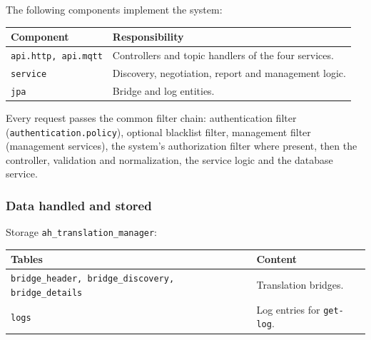 \documentclass[a4paper]{arrowhead}
\begin{document}
The following components implement the system:

\noindent\begin{longtable}{| p{5.6cm} | p{9.6cm} |} \hline
\rowcolor{gray!33} Component & Responsibility \\ \hline \endhead
\texttt{api.\allowbreak{}http,\allowbreak{} api.\allowbreak{}mqtt} & Controllers and topic handlers of the four services. \\ \hline
\texttt{service} & Discovery, negotiation, report and management logic. \\ \hline
\texttt{jpa} & Bridge and log entities. \\ \hline
\end{longtable}

Every request passes the common filter chain: authentication filter (\texttt{authentication.\allowbreak{}policy}), optional blacklist filter, management filter (management services), the system's authorization filter where present, then the controller, validation and normalization, the service logic and the database service.

\subsubsection{Data handled and stored}

Storage \texttt{ah\_\allowbreak{}translation\_\allowbreak{}manager}:

\noindent\begin{longtable}{| p{6.4cm} | p{8.8cm} |} \hline
\rowcolor{gray!33} Tables & Content \\ \hline \endhead
\texttt{bridge\_\allowbreak{}header,\allowbreak{} bridge\_\allowbreak{}discovery,\allowbreak{} bridge\_\allowbreak{}details} & Translation bridges. \\ \hline
\texttt{logs} & Log entries for \texttt{get-\allowbreak{}log}. \\ \hline
\end{longtable}
\end{document}
